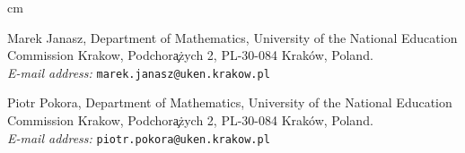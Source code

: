 \documentclass[11pt]{article}
\theoremstyle{plain}
\theoremstyle{definition}
\begin{document}
 cm
\bigskip

Marek Janasz, 
Department of Mathematics,
University of the National Education Commission Krakow,
Podchor\c a\.zych 2,
PL-30-084 Krak\'ow, Poland. \\
\nopagebreak
\textit{E-mail address:} \texttt{marek.janasz@uken.krakow.pl}
\bigskip

Piotr Pokora,
Department of Mathematics,
University of the National Education Commission Krakow,
Podchor\c a\.zych 2,
PL-30-084 Krak\'ow, Poland. \\
\nopagebreak
\textit{E-mail address:} \texttt{piotr.pokora@uken.krakow.pl}
\end{document}
